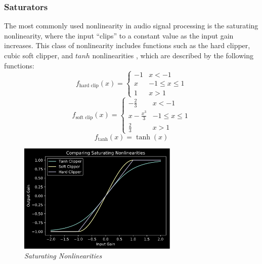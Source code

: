 \documentclass[twoside,a4paper]{article}
\begin{document}
\subsubsection{Saturators} \label{sec:sat}
%
The most commonly used nonlinearity in audio signal processing is
the saturating nonlinearity, where the input ``clips'' to a constant
value as the input gain increases. This class of nonlinearity includes
functions such as the hard clipper, cubic soft clipper, and $tanh$
nonlinearities \cite{Yeh}, which are described by the following functions:
%
\begin{equation}
    f_{\text{hard clip}}(x) = \begin{cases}
        -1& x < -1 \\
        x& -1 \leq x \leq 1 \\
        1& x > 1
    \end{cases}
    \label{eq:hard-clip}
\end{equation}
\newline
%
\begin{equation}
    f_{\text{soft clip}}(x) = \begin{cases}
        -\frac{2}{3}& x < -1 \\
        x - \frac{x^3}{3}& -1 \leq x \leq 1 \\
        \frac{2}{3}& x > 1
    \end{cases}
    \label{eq:soft-clip}
\end{equation}
\newline
%
\begin{equation}
    f_{\text{tanh}}(x) = \tanh(x)
    \label{eq:tanh-clip}
\end{equation}
%
\begin{figure}[!htb]
    \center
    \includegraphics[width=3in]{../NonlinearBiquad/Pics/Sat-NLs.png}
    \caption{\label{Sats}{\it Saturating Nonlinearities}}
\end{figure}
%
\end{document}
